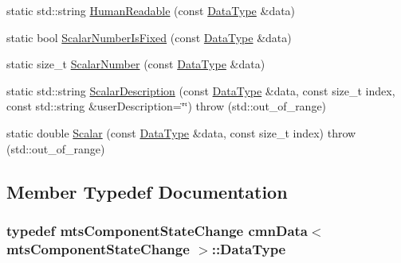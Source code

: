 \begin{DoxyCompactItemize}
\item 
static std\-::string \hyperlink{classcmn_data_3_01mts_component_state_change_01_4_a427832b3b27491d21f2a0c1e83bf0bee}{Human\-Readable} (const \hyperlink{classcmn_data_3_01mts_component_state_change_01_4_ac0a63a5c1053b74da61e82e08c0a5d7b}{Data\-Type} \&data)
\item 
static bool \hyperlink{classcmn_data_3_01mts_component_state_change_01_4_a18562cdb4417a033af5bac6ae2da2a6d}{Scalar\-Number\-Is\-Fixed} (const \hyperlink{classcmn_data_3_01mts_component_state_change_01_4_ac0a63a5c1053b74da61e82e08c0a5d7b}{Data\-Type} \&data)
\item 
static size\-\_\-t \hyperlink{classcmn_data_3_01mts_component_state_change_01_4_a5a9efbd6dcab3bc9a4e87d17d5d6b693}{Scalar\-Number} (const \hyperlink{classcmn_data_3_01mts_component_state_change_01_4_ac0a63a5c1053b74da61e82e08c0a5d7b}{Data\-Type} \&data)
\item 
static std\-::string \hyperlink{classcmn_data_3_01mts_component_state_change_01_4_a37782e789da0b143aed01fca25ee3a99}{Scalar\-Description} (const \hyperlink{classcmn_data_3_01mts_component_state_change_01_4_ac0a63a5c1053b74da61e82e08c0a5d7b}{Data\-Type} \&data, const size\-\_\-t index, const std\-::string \&user\-Description=\char`\"{}\char`\"{})  throw (std\-::out\-\_\-of\-\_\-range)
\item 
static double \hyperlink{classcmn_data_3_01mts_component_state_change_01_4_a37d589f934cc2457f3669fd1ff015208}{Scalar} (const \hyperlink{classcmn_data_3_01mts_component_state_change_01_4_ac0a63a5c1053b74da61e82e08c0a5d7b}{Data\-Type} \&data, const size\-\_\-t index)  throw (std\-::out\-\_\-of\-\_\-range)
\end{DoxyCompactItemize}


\subsection{Member Typedef Documentation}
\hypertarget{classcmn_data_3_01mts_component_state_change_01_4_ac0a63a5c1053b74da61e82e08c0a5d7b}{
\subsubsection[{Data\-Type}]{\setlength{\rightskip}{0pt plus 5cm}typedef {\bf mts\-Component\-State\-Change} {\bf cmn\-Data}$<$ {\bf mts\-Component\-State\-Change} $>$\-::{\bf Data\-Type}}}\label{classcmn_data_3_01mts_component_state_change_01_4_ac0a63a5c1053b74da61e82e08c0a5d7b}


